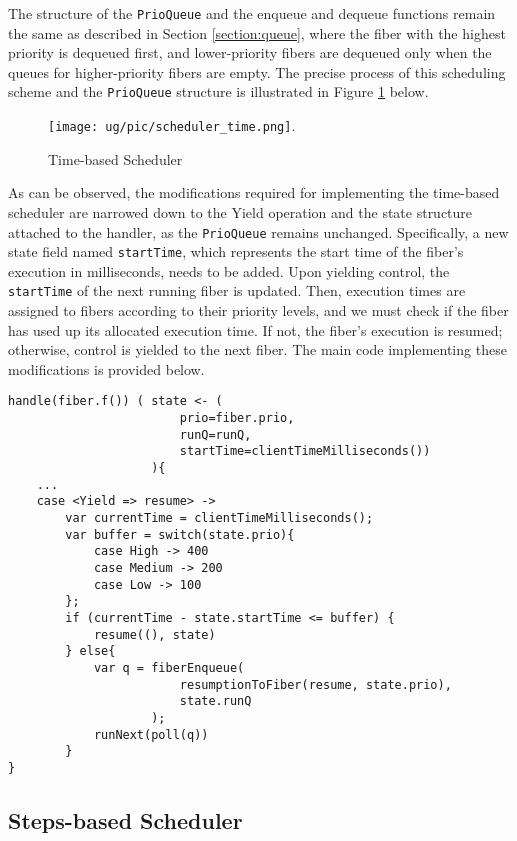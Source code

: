 \documentclass[logo,bsc,singlespacing,parskip]{infthesis}
\begin{document}
The structure of the \texttt{PrioQueue} and the enqueue and dequeue functions remain the same as described in Section \ref{section:queue}, where the fiber with the highest priority is dequeued first, and lower-priority fibers are dequeued only when the queues for higher-priority fibers are empty. The precise process of this scheduling scheme and the \texttt{PrioQueue} structure is illustrated in Figure \ref{fig:scheduler_time} below.

\begin{figure}[htbp]
    \centering
    \texttt{[image: ug/pic/scheduler\_time.png]}.
    \caption{Time-based Scheduler}
    \label{fig:scheduler_time}
\end{figure}

As can be observed, the modifications required for implementing the time-based scheduler are narrowed down to the Yield operation and the state structure attached to the handler, as the \texttt{PrioQueue} remains unchanged. Specifically, a new state field named \texttt{startTime}, which represents the start time of the fiber's execution in milliseconds, needs to be added. Upon yielding control, the \texttt{startTime} of the next running fiber is updated. Then, execution times are assigned to fibers according to their priority levels, and we must check if the fiber has used up its allocated execution time. If not, the fiber's execution is resumed; otherwise, control is yielded to the next fiber. The main code implementing these modifications is provided below.

\begin{verbatim}
handle(fiber.f()) ( state <- (
                        prio=fiber.prio, 
                        runQ=runQ, 
                        startTime=clientTimeMilliseconds()) 
                    ){
    ...
    case <Yield => resume> ->
        var currentTime = clientTimeMilliseconds();
        var buffer = switch(state.prio){
            case High -> 400
            case Medium -> 200
            case Low -> 100
        };
        if (currentTime - state.startTime <= buffer) {
            resume((), state)
        } else{
            var q = fiberEnqueue(
                        resumptionToFiber(resume, state.prio), 
                        state.runQ
                    );
            runNext(poll(q))
        }
}
\end{verbatim}

\subsection{Steps-based Scheduler}
\end{document}
